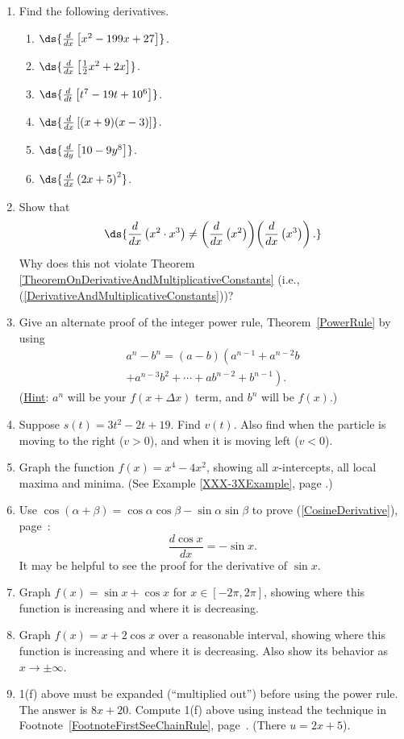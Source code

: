 \begin{multicols}{2}

\begin{enumerate}
\item Find the following derivatives.
\begin{enumerate}
\item $\ds{\frac{d}{dx}\left[x^2-199x+27\right]}$.
\item $\ds{\frac{d}{dx}\left[\frac12x^2+2x\right]}$.
\item $\ds{\frac{d}{dt}\left[t^7-19t+10^6\right]}$.
\item $\ds{\frac{d}{dx}\left[(x+9)(x-3)\right]}$.
\item $\ds{\frac{d}{dy}\left[10-9y^8\right]}$.
\item $\ds{\frac{d}{dx}\left(2x+5\right)^2}$.
\end{enumerate}

\item Show that $$\ds{\frac{d}{dx}\left(x^2\cdot x^3\right)
\ne\left(\frac{d}{dx}\left(x^2\right)\right)
\!\left(\frac{d}{dx}\left(x^3\right)\right).}$$
Why does this not violate Theorem~%
\ref{TheoremOnDerivativeAndMultiplicativeConstants}
(i.e., (\ref{DerivativeAndMultiplicativeConstants}))?
\label{NoSimpleProductRuleExercise}
\item Give an alternate proof of the integer power rule,
Theorem~\ref{PowerRule} by using
\begin{multline*}
a^n-b^n=(a-b)\left(a^{n-1}+a^{n-2}b\right.\\ \left.+a^{n-3}b^2
+\cdots+ab^{n-2}+b^{n-1}
\right).\end{multline*}
(\underline{Hint}: $a^n$ will be your $f(x+\Delta x)$ term,
and $b^n$ will be $f(x)$.)
\item Suppose $s(t)=3t^2-2t+19$.  Find $v(t)$.  Also 
find when the particle is moving to the right ($v>0$), and when
it is moving left ($v<0$).
\item Graph the function $f(x)=x^4-4x^2$, showing all
$x$-intercepts, all local maxima and minima.  
(See Example \ref{XXX-3XExample}, page \pageref{XXX-3XExample}.)

\item Use $\cos(\alpha+\beta)=\cos\alpha\cos\beta-\sin\alpha\sin\beta$
to prove (\ref{CosineDerivative}), page~\pageref{CosineDerivative}:
$$\frac{d\cos x}{dx}=-\sin x.$$
It may be helpful to see the proof for the derivative of $\sin x$.

\item Graph $f(x)=\sin x+\cos x$ for $x\in[-2\pi,2\pi]$,
showing where this function is increasing and where it is decreasing.
\item Graph $f(x)=x+2\cos x$ over a reasonable interval, showing
where this function is increasing and where it is decreasing.
Also show its behavior as $x\to\pm\infty$.


\item 1(f) above must be expanded (``multiplied out'')
before using the power rule.  The answer is $8x+20$.
Compute 1(f) above using instead the technique in 
Footnote~\ref{FootnoteFirstSeeChainRule}, 
page~\pageref{FootnoteFirstSeeChainRule}. (There $u=2x+5$).
\end{enumerate}
\end{multicols}
\newpage
